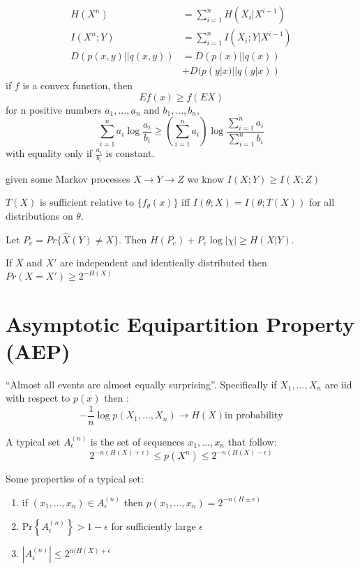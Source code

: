 \documentclass[10pt]{article}
\begin{document}
\begin{tiny}
\begin{multicols}{3}
\begin{align}
H(X^n)&=\sum_{i=1}^n H(X_i|X^{i-1})\\
I(X^n;Y)&=\sum_{i=1}^n I(X_i;Y|X^{i-1})\\
D(p(x,y)||q(x,y))&=D(p(x)||q(x))\\
&+D(p(y|x)||q(y|x))
\end{align}
 \label{thm: jensen}
if $f$ is a convex function, then
\begin{equation}
Ef(x) \geq f(EX)
\end{equation}
 \label{thm: log sum}
for n positive numbers $a_1,\ldots,a_n$ and $b_1,\ldots,b_n$,
\begin{equation}
\sum_{i=1}^n a_i \log \frac{a_i}{b_i} \geq \left( \sum_{i=1}^n a_i \right) \log \frac{\sum_{i=1}^n a_i}{\sum_{i=1}^n b_i}
\end{equation}
with equality only if $\frac{a_i}{b_i}$ is constant. 

 \label{thm: data processing} 
given some Markov processes $X\rightarrow Y\rightarrow Z$ we know
\( I(X;Y) \geq I(X;Z) \)

 \label{thm: suff stats}
$T(X)$ is sufficient relative to $\{f_\theta (x)\}$ iff $I(\theta;X)=I(\theta;T(X))$ for all distributions on $\theta$.

 \label{thm: fano}
Let $P_e=Pr\{\hat{X}(Y)\neq X\}$. Then $H(P_e)+P_e \log |\chi| \geq H(X|Y)$.

\thm[Inequality] \label{thm: Ineq}
If $X$ and $X'$ are independent and identically distributed then $Pr(X=X') \geq 2^{-H(X)}$


\section*{Asymptotic Equipartition Property (AEP)}
``Almost all events are almost equally surprising''. Specifically if $X_1,\ldots,X_n$ are iid with respect to $p(x)$ then :
\begin{equation}
-\frac{1}{n}\log p(X_1,\ldots,X_n)\rightarrow H(X) \text{in probability}
\end{equation}

A typical set $A_\epsilon^{(n)}$ is the set of sequences $x_1,\ldots, x_n$ that follow:
\begin{equation}
2^{-n(H(X)+\epsilon)}\leq p(X^n)\leq 2^{-n(H(X)-\epsilon)}
\end{equation}

Some properties of a typical set:
\begin{enumerate}
\item if $(x_1,\ldots,x_n) \in A_\epsilon^{(n)}$ then $p(x_1,\ldots,x_n) = 2^{-n(H\pm \epsilon)}$
\item Pr$\left\{A_\epsilon^{(n)}\right\}>1-\epsilon$ for sufficiently large $\epsilon$
\item $|A_\epsilon^{(n)}| \leq 2^{n(H(X)+\epsilon}$
\end{enumerate}


\end{multicols}
\end{tiny}
\end{document}
